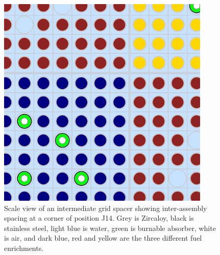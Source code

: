 \begin{figure}[htbp]
    \centering
    \includegraphics[width=4in]{specifications/assy/figs/grid_zoom.png}

    \caption[Scale view of grid spacer model]{Scale view of an intermediate grid
    spacer showing inter-assembly spacing at a corner of position J14.
    Grey is Zircaloy, black is stainless steel, light blue is water, green is
    burnable absorber, white is air, and dark blue, red and yellow are the three
    different fuel enrichments.\label{fig_grid_assembly_zoom}}
\end{figure}
